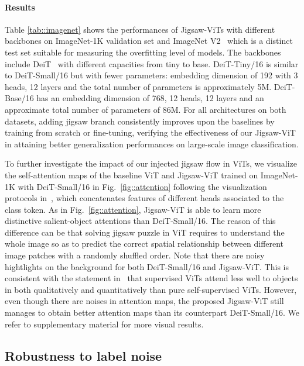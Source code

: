 \documentclass{article}
\begin{document}
\paragraph{Results} 
{Table \ref{tab::imagenet} shows the performances of Jigsaw-ViTs with different backbones on ImageNet{-1K} validation set and ImageNet V2~\cite{recht2019imagenet} which is a distinct test set suitable for measuring the overfitting level of models.
The backbones include DeiT~\cite{touvron2021training} with different capacities from tiny to base.}
DeiT-Tiny/16 is similar to DeiT-Small/16 but with fewer parameters: embedding dimension of 192 with 3 heads, 12 layers and the total number of parameters is approximately 5M. 
{DeiT-Base/16 has an embedding dimension of 768, 12 heads, 12 layers and an approximate total number of parameters of 86M.} 
{For all architectures on both datasets, adding jigsaw branch consistently improves upon the baselines 
by training from scratch or fine-tuning}, verifying the effectiveness of our Jigsaw-ViT in attaining better generalization performances on large-scale image classification. 

To further investigate the impact of our injected jigsaw flow in ViTs, we visualize the self-attention maps of the baseline ViT and Jigsaw-ViT trained on ImageNet{-1K} with DeiT-Small/16 in Fig.~\ref{fig::attention} following the visualization protocols in~\cite{caron2021emerging}, which concatenates features of different heads associated to the class token.
As in Fig.~\ref{fig::attention}, Jigsaw-ViT is able to learn more distinctive salient-object attentions than DeiT-Small/16.
The reason of this difference can be that solving jigsaw puzzle in ViT requires to understand the whole image so as to predict the correct spatial relationship between different image patches with a randomly shuffled order.
Note that there are noisy hightlights on the background for both DeiT-Small/16 and Jigsaw-ViT.
This is consistent with the statement in~\cite{caron2021emerging} that supervised ViTs attend less well to objects in both qualitatively and quantitatively than pure self-supervised ViTs.
However, even though there are noises in attention maps, the proposed Jigsaw-ViT still manages to obtain better attention maps than its counterpart DeiT-Small/16.
We refer to supplementary material for more visual results.


    
\subsection{Robustness to label noise}
\label{subsec::labelnoise}
\end{document}

